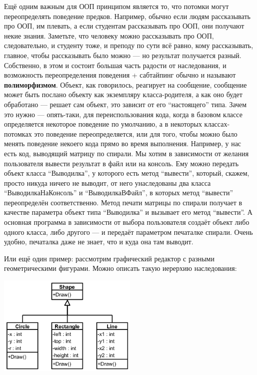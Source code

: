 \documentclass[a5paper]{article}
\begin{document}
Ещё одним важным для ООП принципом является то, что потомки могут переопределять поведение предков. Например, обычно если людям рассказывать про ООП, им плевать, а если студентам рассказывать про ООП, они получают некие знания. Заметьте, что человеку можно рассказывать про ООП, следовательно, и студенту тоже, и преподу по сути всё равно, кому рассказывать, главное, чтобы рассказывать было можно --- но результат получается разный. Собственно, в этом и состоит большая часть радости от наследования, и возможность переопределения поведения + сабтайпинг обычно и называют \textbf{полиморфизмом}. Объект, как говорилось, реагирует на сообщение, сообщение может быть послано объекту как экземпляру класса-родителя, а как оно будет обработано --- решает сам объект, это зависит от его ``настоящего'' типа. Зачем это нужно --- опять-таки, для переиспользования кода, когда в базовом классе определяется некоторое поведение по умолчанию, а в некоторых классах-потомках это поведение переопределяется, или для того, чтобы можно было менять поведение некоего кода прямо во время выполнения. Например, у нас есть код, выводящий матрицу по спирали. Мы хотим в зависимости от желания пользователя вывести результат в файл или на консоль. Ему можно передать объект класса ``Выводилка'', у которого есть метод ``вывести'', который, скажем, просто никуда ничего не выводит, от него унаследованы два класса ``ВыводилкаНаКонсоль'' и ``ВыводилкаВФайл'', в которых метод ``вывести'' переопределён соответственно. Метод печати матрицы по спирали получает в качестве параметра объект типа ``Выводилка'' и вызывает его метод ``вывести''. А основная программа в зависимости от выбора пользователя создаёт объект либо одного класса, либо другого --- и передаёт параметром печаталке спирали. Очень удобно, печаталка даже не знает, что и куда она там выводит.

Или ещё один пример: рассмотрим графический редактор с разными геометрическими фигурами. Можно описать такую иерерхию наследования:

\begin{center}
	\includegraphics[width=0.5\textwidth]{polymorphism.png}
\end{center}
\end{document}
